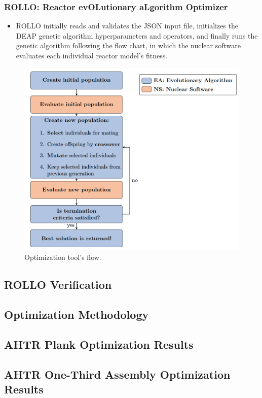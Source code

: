 \begin{frame}
    \frametitle{ROLLO: Reactor evOLutionary aLgorithm Optimizer}
    \begin{minipage}[c]{0.45\textwidth}
        \begin{itemize}
            \item ROLLO initially reads and validates the JSON input file, initializes 
            the DEAP genetic algorithm hyperparameters and operators, and finally runs
            the genetic algorithm following the flow chart, in which the nuclear 
            software evaluates each individual reactor model's fitness.
        \end{itemize}
        \end{minipage}\hfill
        \begin{minipage}[c]{0.52\textwidth}
            \centering
            \begin{figure}
                \includegraphics[width=\linewidth]{figures/rollo-flow.png} 
                \caption{Optimization tool's flow.}
            \end{figure}
        \end{minipage}
\end{frame}

\subsection{ROLLO Verification}
\subsection{Optimization Methodology}
\subsection{AHTR Plank Optimization Results}
\subsection{AHTR One-Third Assembly Optimization Results}